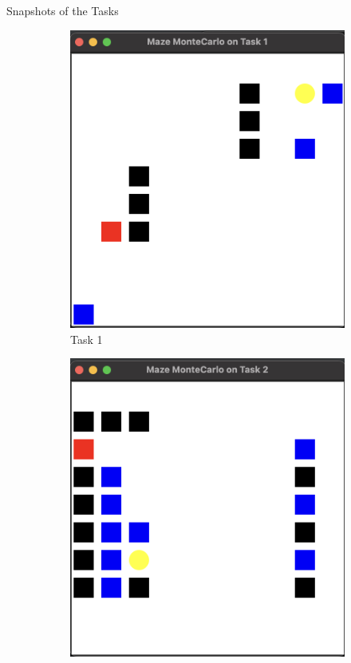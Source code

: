 \documentclass{beamer}
\begin{document}
\begin{frame}{Snapshots of the Tasks}
  \centering
  
\begin{figure}[t]
    \centering
    \begin{subfigure}{0.315\textwidth}
        \centering
        \includegraphics[width=\textwidth]{figs/task1.png}
        \caption{Task 1}
        \label{Fig_Task1}
    \end{subfigure}
    \hfill
    \begin{subfigure}{0.315\textwidth}
        \centering
        \includegraphics[width=\textwidth]{figs/task2.png}

\end{subfigure}
\end{figure}
\end{frame}
\end{document}
